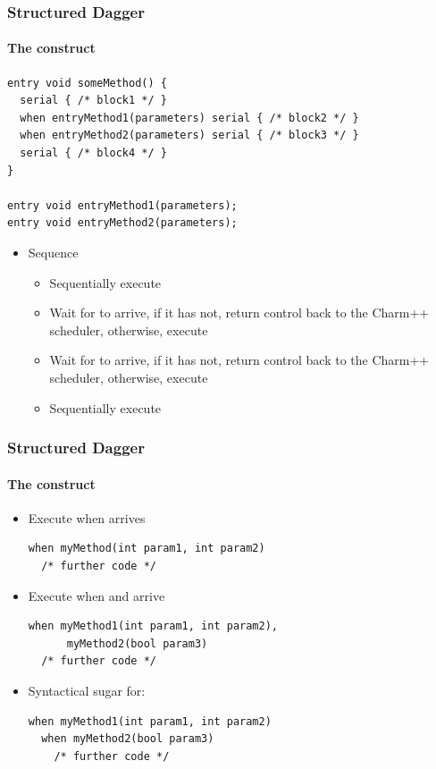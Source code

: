 \begin{frame}[fragile]
  \frametitle{Structured Dagger}
  \framesubtitle{The  construct}
      \begin{lstlisting}[basicstyle=\tiny]
entry void someMethod() {
  serial { /* block1 */ }
  when entryMethod1(parameters) serial { /* block2 */ }
  when entryMethod2(parameters) serial { /* block3 */ }
  serial { /* block4 */ }
}

entry void entryMethod1(parameters);
entry void entryMethod2(parameters);
      \end{lstlisting}
  \begin{itemize}
    \item Sequence
      \pause
      \begin{itemize}
        \item Sequentially execute 
          \pause
        \item Wait for  to arrive, if it has not, return control
          back to the Charm++ scheduler, otherwise, execute 
          \pause
        \item Wait for  to arrive, if it has not, return control
          back to the Charm++ scheduler, otherwise, execute 
          \pause
        \item Sequentially execute 
      \end{itemize}
    \end{itemize}
\end{frame}

\begin{frame}[fragile]
  \frametitle{Structured Dagger}
  \framesubtitle{The  construct}
  \begin{itemize}
  \item Execute  when  arrives
  \begin{lstlisting}[basicstyle=\scriptsize]
when myMethod(int param1, int param2)
  /* further code */
  \end{lstlisting}

  \item Execute  when  and  arrive
  \begin{lstlisting}[basicstyle=\scriptsize]
when myMethod1(int param1, int param2),
      myMethod2(bool param3)
  /* further code */
  \end{lstlisting}

\item Syntactical sugar for:
  \begin{lstlisting}[basicstyle=\scriptsize]
when myMethod1(int param1, int param2)
  when myMethod2(bool param3)
    /* further code */
  \end{lstlisting}

  \end{itemize}
\end{frame}

